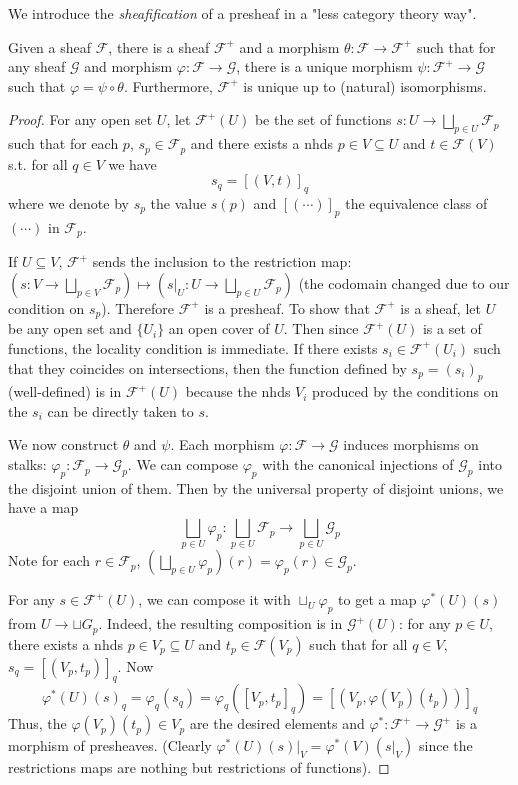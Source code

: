 \documentclass[12pt,letter]{article}
\begin{document}
	We introduce the \textit{sheafification} of a presheaf in a "less category theory way".
	\begin{theorem}[sheafification]\label{t121}
	Given a sheaf $\mathscr F$, there is a sheaf $\mathscr F^+$ and a morphism $\theta: \mathscr F\to \mathscr F^+$ such that for any sheaf $\mathscr G$ and morphism $\varphi:\mathscr F\to\mathscr G$, there is a unique morphism $\psi:\mathscr F^+\to \mathscr G$ such that $\varphi=\psi\circ\theta$. Furthermore, $\mathscr F^+$ is unique up to (natural) isomorphisms. 
	\end{theorem}
	\begin{proof}
	For any open set $U$, let $\mathscr F^+(U)$ be the set of functions $s:U\to \bigsqcup_{p\in U}\mathscr F_p$ such that for each $p$, $s_p\in \mathscr F_p$ and there exists a nhds $p\in V\subseteq U$ and $t\in\mathscr F(V)$ s.t. for all $q\in V$ we have
	\[s_q=[(V, t)]_q\]
	where we denote by $s_p$ the value $s(p)$ and $[(\cdots)]_p$ the equivalence class of $(\cdots)$ in $\mathscr F_p$.
	
	If $U\subseteq V$, $\mathscr F^+$ sends the inclusion to the restriction map: $(s:V\to \bigsqcup_{p\in V}\mathscr F_p)\mapsto (s|_U:U\to \bigsqcup_{p\in U}\mathscr F_p)$ (the codomain changed due to our condition on $s_p$). Therefore $\mathscr F^+$ is a presheaf. To show that $\mathscr F^+$ is a sheaf, let $U$ be any open set and $\{U_i\}$ an open cover of $U$. Then since $\mathscr F^+(U)$ is a set of functions, the locality condition is immediate. If there exists $s_i\in \mathscr F^+(U_i)$ such that they coincides on intersections, then the function defined by $s_p=(s_{i})_p$ (well-defined) is in $\mathscr F^+(U)$ because the nhds $V_i$ produced by the conditions on the $s_i$ can be directly taken to $s$.
	
	We now construct $\theta$ and $\psi$. Each morphism $\varphi: \mathscr F\to \mathscr G$ induces morphisms on stalks: $\varphi_p:\mathscr F_p\to \mathscr G_p$. We can compose $\varphi_p$ with the canonical injections of $\mathscr G_p$ into the disjoint union of them. Then by the universal property of disjoint unions, we have a map 
	\[\bigsqcup_{p\in U}\varphi_p:\bigsqcup_{p\in U}\mathscr F_p\to \bigsqcup_{p\in U}\mathscr G_p\]
	Note for each $r\in \mathscr F_p$, $\left(\bigsqcup_{p\in U}\varphi_p\right)(r)=\varphi_p(r)\in\mathscr G_p$.

	For any $s\in\mathscr F^+(U)$, we can compose it with $\sqcup_U\varphi_p$ to get a map $\varphi^*(U)(s)$ from $U\to \sqcup G_p$. Indeed, the resulting composition is in $\mathscr G^+(U)$: for any $p\in U$, there exists a nhds $p\in V_p\subseteq U$ and $t_p\in\mathscr F(V_p)$ such that for all $q\in V$, $s_q=[(V_p,t_p)]_q$. Now 
	\[\varphi^*(U)(s)_q=\varphi_q(s_q)=\varphi_q([V_p, t_p]_q)=[(V_p, \varphi(V_p)(t_p))]_q\]
	Thus, the $\varphi(V_p)(t_p)\in V_p$ are the desired elements and $\varphi^*:\mathscr F^+\to\mathscr G^+$ is a morphism of presheaves. (Clearly $\varphi^*(U)(s)|_V=\varphi^*(V)(s|_V)$ since the restrictions maps are nothing but restrictions of functions).
	

\end{proof}
\end{document}
